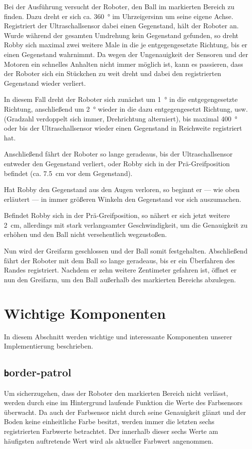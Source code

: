 \documentclass{fetch-my-doc}
\begin{document}
    Bei der Ausführung versucht der Roboter, den Ball im markierten Bereich zu finden. Dazu dreht er sich ca. \SI{360}{\degree} im Uhrzeigersinn um seine eigene Achse. Registriert der Ultraschallsensor dabei einen Gegenstand, hält der Roboter an. Wurde während der gesamten Umdrehung kein Gegenstand gefunden, so dreht Robby sich maximal zwei weitere Male in die je entgegengesetzte Richtung, bis er einen Gegenstand wahrnimmt. Da wegen der Ungenauigkeit der Sensoren und der Motoren ein schnelles Anhalten nicht immer möglich ist, kann es passieren, dass der Roboter sich ein Stückchen zu weit dreht und dabei den registrierten Gegenstand wieder \glqq verliert\grqq. 
    
    In diesem Fall dreht der Roboter sich zunächst um \SI{1}{\degree} in die entgegengesetzte Richtung, anschließend um \SI{2}{\degree} wieder in die dazu entgegengesetzt Richtung, usw. (Gradzahl
    verdoppelt sich immer, Drehrichtung alterniert), bis maximal \SI{400}{\degree} oder bis der Ultraschallsensor wieder einen Gegenstand in Reichweite registriert hat.
    
    Anschließend fährt der Roboter so lange geradeaus, bis der Ultraschallsensor entweder den Gegenstand \glqq verliert\grqq, oder Robby sich in der Prä-Greifposition befindet (ca. \SI{7,5}{\centi\meter} vor dem Gegenstand).
    
    Hat Robby den Gegenstand \glqq aus den Augen verloren\grqq, so beginnt er --- wie oben erläutert --- in immer größeren Winkeln den Gegenstand vor sich auszumachen.
    
    Befindet Robby sich in der Prä-Greifposition, so nähert er sich jetzt weitere \SI{2}{\centi\meter}, allerdings mit stark verlangsamter Geschwindigkeit, um die Genauigkeit zu erhöhen und den Ball nicht versehentlich wegzustoßen.
    
    Nun wird der Greifarm geschlossen und der Ball somit festgehalten. Abschließend fährt der Roboter mit dem Ball so lange geradeaus, bis er ein Überfahren des Randes registriert. Nachdem er zehn weitere Zentimeter gefahren ist, öffnet er nun den Greifarm, um den Ball außerhalb des markierten Bereichs abzulegen.
   
  \section{Wichtige Komponenten}
    In diesem Abschnitt werden wichtige und interessante Komponenten unserer Implementierung beschrieben.
		\subsection{\texttt border-patrol}
      Um sicherzugehen, dass der Roboter den markierten Bereich nicht verlässt, werden durch eine im Hintergrund laufende Funktion die Werte des Farbsensors überwacht. Da auch der Farbsensor nicht durch seine Genauigkeit glänzt und der Boden keine einheitliche Farbe besitzt, werden immer die letzten sechs registrierten Farbwerte betrachtet. Der innerhalb dieser sechs Werte am häufigsten auftretende Wert wird als aktueller Farbwert angenommen.
      
\end{document}
